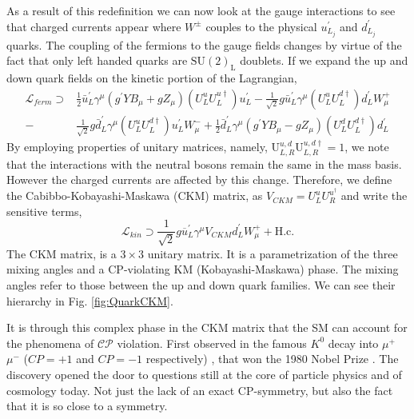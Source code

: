 As a result of this redefinition we can now look at the gauge interactions to see that charged currents appear where $W^\pm$ couples to the physical $u^\prime_{L_j}$ and $d^\prime_{L_j}$ quarks. 
%
The coupling of the fermions to the gauge fields changes by virtue of the fact that only left handed quarks are $\mathrm{SU(2)_L}$ doublets. If we expand the up and down quark fields on the kinetic portion of the Lagrangian,
%
\begin{equation}
\label{LagFermFCCCs}
\begin{aligned}
\mathcal{L}_{ferm} \supset & 
\frac{1}{2} \bar{u}^\prime_L \gamma^\mu \left( g^\prime Y B_\mu + g Z_\mu  \right) \left(U^u_L U^{u \dagger}_L \right) u^\prime_L - \frac{1}{\sqrt{2}} g \bar{u}^\prime_L \gamma^\mu \left( U^u_L U^{d \dagger}_L \right) d^\prime_L W^+_\mu \\    
- 
& \frac{1}{\sqrt{2}} g \bar{d}^\prime_L \gamma^\mu \left( U^u_L U^{d \dagger}_L \right) u^\prime_L W^-_\mu 
+ 
\frac{1}{2} \bar{d}^\prime_L \gamma^\mu \left( g^\prime Y B_\mu - g Z_\mu \right) \left( U^d_L U^{d \dagger}_L \right) d^\prime_L  
\end{aligned}
\end{equation}
%
By employing properties of unitary matrices, namely, $ \mathrm{U}^{u,d}_{L,R} \mathrm{U}^{u,d \dagger}_{L,R} = 1$, we note that the interactions with the neutral bosons remain the same in the mass basis.
%
However the charged currents are affected by this change.
%
Therefore, we define the Cabibbo-Kobayashi-Maskawa (CKM) matrix, as $V_{CKM} = U^u_L U^{u ^\dagger }_R $ and write the sensitive terms,
%
\begin{equation}
\mathcal{L}_{kin} \supset \frac{1}{\sqrt{2}} g \overline{u}^\prime_L \gamma^\mu V_{CKM} d_L^\prime W^+_\mu + \text{H.c.} 
\end{equation}
%
The CKM matrix, is a $3 \times 3$ unitary matrix. It is a parametrization of the three mixing angles and a CP-violating KM (Kobayashi-Maskawa) phase. %
%
The mixing angles refer to those between the up and down quark families. We can see their hierarchy in Fig. \ref{fig:QuarkCKM}.

It is through this complex phase in the CKM matrix that the SM can account for the phenomena of $\mathcal{CP}$ violation.
%
First observed in the famous $K^0$ decay into $\mu^+$ $\mu^-$ ($CP=+1$ and $CP=-1$ respectively) \cite{PhysRevLett.13.138}, that won the 1980 Nobel Prize \cite{NobelPrize:1980-Physics}. 
%
The discovery opened the door to questions still at the core of particle physics and of cosmology today.
%
Not just the lack of an exact CP-symmetry, but also the fact that it is so close to a symmetry.

